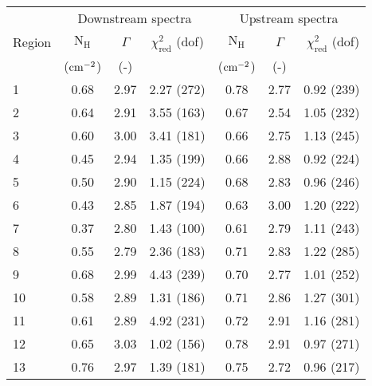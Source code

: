 \begin{tabular}{@{}lcccccr@{}}
\toprule
{} & \multicolumn{3}{c}{Downstream spectra}
   & \multicolumn{3}{c}{Upstream spectra} \\
\cmidrule(lr){2-4} \cmidrule(l){5-7}
Region & $\mathrm{N_H}$ & $\Gamma$ & $\chi^2_{\mathrm{red}}$ (dof)
       & $\mathrm{N_H}$ & $\Gamma$ & $\chi^2_{\mathrm{red}}$ (dof) \\
{} & ($\mathrm{cm}^{-2}$) & (-) & {}
   & ($\mathrm{cm}^{-2}$) & (-) & {} \\
\midrule
1 & 0.68 & 2.97 & 2.27 (272) & 0.78 & 2.77 & 0.92 (239) \\
2 & 0.64 & 2.91 & 3.55 (163) & 0.67 & 2.54 & 1.05 (232) \\
3 & 0.60 & 3.00 & 3.41 (181) & 0.66 & 2.75 & 1.13 (245) \\
4 & 0.45 & 2.94 & 1.35 (199) & 0.66 & 2.88 & 0.92 (224) \\
5 & 0.50 & 2.90 & 1.15 (224) & 0.68 & 2.83 & 0.96 (246) \\
6 & 0.43 & 2.85 & 1.87 (194) & 0.63 & 3.00 & 1.20 (222) \\
7 & 0.37 & 2.80 & 1.43 (100) & 0.61 & 2.79 & 1.11 (243) \\
8 & 0.55 & 2.79 & 2.36 (183) & 0.71 & 2.83 & 1.22 (285) \\
9 & 0.68 & 2.99 & 4.43 (239) & 0.70 & 2.77 & 1.01 (252) \\
10 & 0.58 & 2.89 & 1.31 (186) & 0.71 & 2.86 & 1.27 (301) \\
11 & 0.61 & 2.89 & 4.92 (231) & 0.72 & 2.91 & 1.16 (281) \\
12 & 0.65 & 3.03 & 1.02 (156) & 0.78 & 2.91 & 0.97 (271) \\
13 & 0.76 & 2.97 & 1.39 (181) & 0.75 & 2.72 & 0.96 (217) \\
\bottomrule
\end{tabular}
